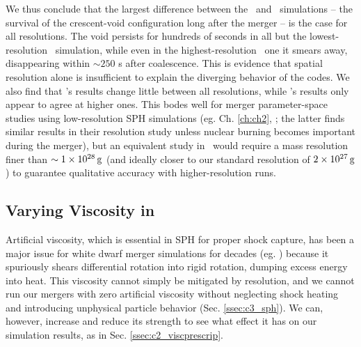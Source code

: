 
We thus conclude that the largest difference between the \gasoline\ and \arepo\ simulations -- the survival of the crescent-void configuration long after the merger -- is the case for all resolutions.  The void persists for hundreds of seconds in all but the lowest-resolution \arepo\ simulation, while even in the highest-resolution \gasoline\ one it smears away, disappearing within $\sim 250$ s after coalescence.  This is evidence that spatial resolution alone is insufficient to explain the diverging behavior of the codes.  We also find that \gasoline's results change little between all resolutions, while \arepo's results only appear to agree at higher ones.  This bodes well for merger parameter-space studies using low-resolution SPH simulations (eg. Ch. \ref{ch:ch2}, \citealt{dan+14}; the latter finds similar results in their resolution study unless nuclear burning becomes important during the merger), but an equivalent study in \arepo\ would require a mass resolution finer than $\sim1\times10^{28}\,\mathrm{g}$ (and ideally closer to our standard resolution of $2\times10^{27}\,\mathrm{g}$) to guarantee qualitative accuracy with higher-resolution runs.

\subsection{Varying Viscosity in \gasoline}
\label{ssec:c3_vary_visc}

Artificial viscosity, which is essential in SPH for proper shock capture, has been a major issue for white dwarf merger simulations for decades (eg. \citealt{guerig04, loreig09}) because it spuriously shears differential rotation into rigid rotation, dumping excess energy into heat.  This viscosity cannot simply be mitigated by resolution, and we cannot run our mergers with zero artificial viscosity without neglecting shock heating and introducing unphysical particle behavior (Sec. \ref{ssec:c3_sph}).  We can, however, increase and reduce its strength to see what effect it has on our simulation results, as in Sec. \ref{ssec:c2_viscprescrip}.

